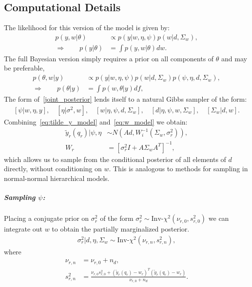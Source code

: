 \documentclass[a4paper,11pt]{article}
\begin{document}
\subsection{Computational Details}
The likelihood for this version of the model is given by:
\begin{align}
 p(y,w|\theta) &\propto p(y|w,\eta,\psi)p(w|d,\Sigma_{w}) , \\
 \nonumber
 \Rightarrow{} \qquad p(y|\theta) &= \int{}p(y,w|\theta)dw .
\end{align}
The full Bayesian version simply requires a prior on all components of $\theta$ and may be preferable,
\begin{align}
\label{joint_posterior} 
 p(\theta,w|y) &\propto p(y|w,\eta,\psi)p(w|d,\Sigma_{w})p(\psi,\eta,d,\Sigma_{w}) ,  \\
 \nonumber
 \Rightarrow{} \qquad p(\theta|y) &= \int{}p(w,\theta|y)df ,
\end{align}
The form of~\eqref{joint_posterior} lends itself to a natural Gibbs sampler of the form:
\begin{align*}
 \left[\psi|w,\eta,y\right] , \quad
 \left[\eta|\sigma^{2},w\right] , \quad
 \left[w|\eta,\psi,d,\Sigma_{w}\right] , \quad
 \left[d|\eta,\psi,w,\Sigma_{w}\right] , \quad 
 \left[\Sigma_{w}|d,w\right] .
\end{align*}
Combining~\eqref{eq:tilde_y_model} and~\eqref{eq:w_model} we obtain:
\begin{align}
\label{eq:marginal_model}
\tilde{y}_{r}(q_{r}) | \psi, \eta  &\sim N\left(Ad,W_{i}^{-1}(\Sigma_{w},\sigma_{r}^{2})\right) , \\
W_{r} &= \left[\sigma_{r}^{2}I + A\Sigma_{w}A^{T}\right]^{-1} ,
\end{align}
which allows us to sample from the conditional posterior of all elements of $d$ directly, without conditioning on $w$. This is analogous to methods for sampling in normal-normal hierarchical models. 
\subparagraph{Sampling $\psi$:} Placing a conjugate prior on $\sigma^{2}_{r}$ of the form $\sigma^{2}_{r}\sim\textrm{Inv-}\chi^{2}(\nu_{r,0},s_{r,0}^{2})$ we can integrate out $w$ to obtain the partially marginalized posterior.
\begin{align*}
 \sigma^{2}_{r} | d,\eta,\Sigma_{w} \sim \textrm{Inv-}\chi^{2}(\nu_{r,n},s_{r,n}^{2}) ,
\end{align*} 
where 
\begin{align*}
 \nu_{r,n} &= \nu_{r,0} + n_{d} , \\
 s_{r,n}^{2} &= \frac{\nu_{r,0}s_{r,0}^{2}+(\tilde{y}_{r}(q_{r})-w_{r})^{T}(\tilde{y}_{r}(q_{r})-w_{r})}{\nu_{r,0}+n_{d}} .
\end{align*}
\end{document}
